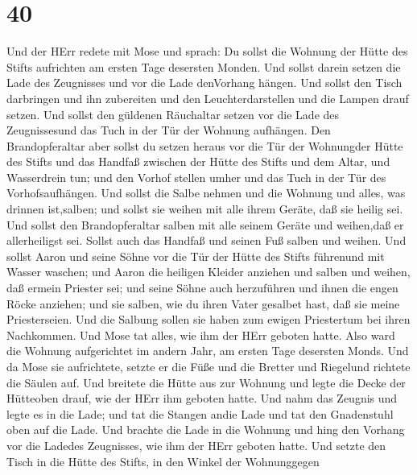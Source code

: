 \hypertarget{section-39}{%
\section{40}\label{section-39}}

 Und der HErr redete mit Mose und sprach:  Du
sollst die Wohnung der Hütte des Stifts aufrichten am ersten Tage
desersten Monden.  Und sollst darein setzen die Lade des
Zeugnisses und vor die Lade denVorhang hängen.  Und sollst
den Tisch darbringen und ihn zubereiten und den Leuchterdarstellen und
die Lampen drauf setzen.  Und sollst den güldenen Räuchaltar
setzen vor die Lade des Zeugnissesund das Tuch in der Tür der Wohnung
aufhängen.  Den Brandopferaltar aber sollst du setzen heraus
vor die Tür der Wohnungder Hütte des Stifts  und das Handfaß
zwischen der Hütte des Stifts und dem Altar, und Wasserdrein tun;
 und den Vorhof stellen umher und das Tuch in der Tür des
Vorhofsaufhängen.  Und sollst die Salbe nehmen und die
Wohnung und alles, was drinnen ist,salben; und sollst sie weihen mit
alle ihrem Geräte, daß sie heilig sei.  Und sollst den
Brandopferaltar salben mit alle seinem Geräte und weihen,daß er
allerheiligst sei.  Sollst auch das Handfaß und seinen Fuß
salben und weihen.  Und sollst Aaron und seine Söhne vor
die Tür der Hütte des Stifts führenund mit Wasser waschen; 
und Aaron die heiligen Kleider anziehen und salben und weihen, daß
ermein Priester sei;  und seine Söhne auch herzuführen und
ihnen die engen Röcke anziehen;  und sie salben, wie du
ihren Vater gesalbet hast, daß sie meine Priesterseien. Und die Salbung
sollen sie haben zum ewigen Priestertum bei ihren Nachkommen.
 Und Mose tat alles, wie ihm der HErr geboten hatte.
 Also ward die Wohnung aufgerichtet im andern Jahr, am
ersten Tage desersten Monds.  Und da Mose sie aufrichtete,
setzte er die Füße und die Bretter und Riegelund richtete die Säulen
auf.  Und breitete die Hütte aus zur Wohnung und legte die
Decke der Hütteoben drauf, wie der HErr ihm geboten hatte. 
Und nahm das Zeugnis und legte es in die Lade; und tat die Stangen andie
Lade und tat den Gnadenstuhl oben auf die Lade.  Und
brachte die Lade in die Wohnung und hing den Vorhang vor die Ladedes
Zeugnisses, wie ihm der HErr geboten hatte.  Und setzte den
Tisch in die Hütte des Stifts, in den Winkel der Wohnunggegen
